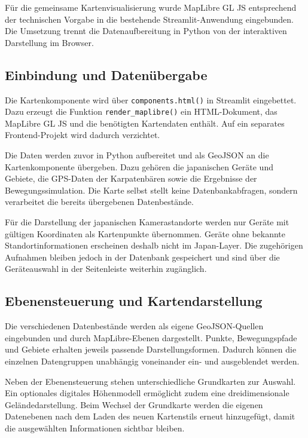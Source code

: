 \documentclass[12pt,a4paper]{report}
\begin{document}
Für die gemeinsame Kartenvisualisierung wurde MapLibre GL JS
entsprechend der technischen Vorgabe in die bestehende
Streamlit-Anwendung eingebunden. Die Umsetzung trennt die
Datenaufbereitung in Python von der interaktiven Darstellung
im Browser.

\subsection{Einbindung und Datenübergabe}
\label{subsec:aufbau-karte}

Die Kartenkomponente wird über
\texttt{components.html()} in Streamlit eingebettet. Dazu
erzeugt die Funktion \texttt{render\_maplibre()} ein
HTML-Dokument, das MapLibre GL JS und die benötigten
Kartendaten enthält. Auf ein separates Frontend-Projekt
wird dadurch verzichtet.

Die Daten werden zuvor in Python aufbereitet und als
GeoJSON an die Kartenkomponente übergeben. Dazu gehören
die japanischen Geräte und Gebiete, die GPS-Daten der
Karpatenbären sowie die Ergebnisse der Bewegungssimulation.
Die Karte selbst stellt keine Datenbankabfragen, sondern
verarbeitet die bereits übergebenen Datenbestände.


Für die Darstellung der japanischen Kamerastandorte
werden nur Geräte mit gültigen Koordinaten als
Kartenpunkte übernommen. Geräte ohne bekannte
Standortinformationen erscheinen deshalb nicht
im Japan-Layer. Die zugehörigen Aufnahmen bleiben
jedoch in der Datenbank gespeichert und sind
über die Geräteauswahl in der Seitenleiste
weiterhin zugänglich.


\subsection{Ebenensteuerung und Kartendarstellung}

Die verschiedenen Datenbestände werden als eigene
GeoJSON-Quellen eingebunden und durch MapLibre-Ebenen
dargestellt. Punkte, Bewegungspfade und Gebiete erhalten
jeweils passende Darstellungsformen. Dadurch können die
einzelnen Datengruppen unabhängig voneinander ein- und
ausgeblendet werden.

Neben der Ebenensteuerung stehen unterschiedliche
Grundkarten zur Auswahl. Ein optionales digitales
Höhenmodell ermöglicht zudem eine dreidimensionale
Geländedarstellung. Beim Wechsel der Grundkarte werden
die eigenen Datenebenen nach dem Laden des neuen
Kartenstils erneut hinzugefügt, damit die ausgewählten
Informationen sichtbar bleiben.
\end{document}
